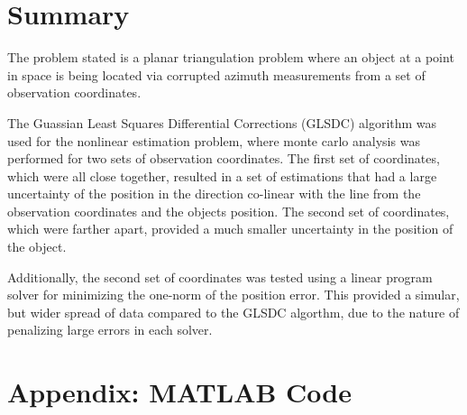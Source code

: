 \documentclass{article}
\begin{document}
\section{Summary}
The problem stated is a planar triangulation problem where an object at a point in space is being located via corrupted azimuth measurements from a set of observation coordinates. 
\par The Guassian Least Squares Differential Corrections (GLSDC) algorithm was used for the nonlinear estimation problem, where monte carlo analysis was performed for two sets of observation coordinates. The first set of coordinates, which were all close together, resulted in a set of estimations that had a large uncertainty of the position in the direction co-linear with the line from the observation coordinates and the objects position. The second set of coordinates, which were farther apart, provided a much smaller uncertainty in the position of the object.
\par Additionally, the second set of coordinates was tested using a linear program solver for minimizing the one-norm of the position error. This provided a simular, but wider spread of data compared to the GLSDC algorthm, due to the nature of penalizing large errors in each solver. 

\section{Appendix: MATLAB Code}
\end{document}

